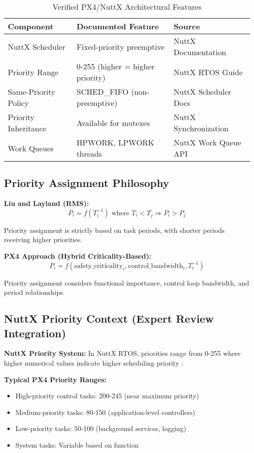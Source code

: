 \documentclass[12pt,a4paper]{article}
\begin{document}
\begin{table}[H]
\centering
\begin{tabular}{|l|l|l|}
\hline
\textbf{Component} & \textbf{Documented Feature} & \textbf{Source} \\
\hline
NuttX Scheduler & Fixed-priority preemptive & NuttX Documentation \\
Priority Range & 0-255 (higher = higher priority) & NuttX RTOS Guide \\
Same-Priority Policy & SCHED\_FIFO (non-preemptive) & NuttX Scheduler Docs \\
Priority Inheritance & Available for mutexes & NuttX Synchronization \\
Work Queues & HPWORK, LPWORK threads & NuttX Work Queue API \\
\hline
\end{tabular}
\caption{Verified PX4/NuttX Architectural Features}
\end{table}

\subsection{Priority Assignment Philosophy}

\textbf{Liu and Layland (RMS):}
\begin{equation}
P_i = f(T_i^{-1}) \text{ where } T_i < T_j \Rightarrow P_i > P_j
\end{equation}

Priority assignment is strictly based on task periods, with shorter periods receiving higher priorities.

\textbf{PX4 Approach (Hybrid Criticality-Based):}
\begin{equation}
P_i = f(\text{safety\_criticality}_i, \text{control\_bandwidth}_i, T_i^{-1})
\end{equation}

Priority assignment considers functional importance, control loop bandwidth, and period relationships.

\subsection{NuttX Priority Context (Expert Review Integration)}

\textbf{NuttX Priority System:} In NuttX RTOS, priorities range from 0-255 where higher numerical values indicate higher scheduling priority \cite{nuttx}.

\textbf{Typical PX4 Priority Ranges:}
\begin{itemize}
\item High-priority control tasks: 200-245 (near maximum priority)
\item Medium-priority tasks: 80-150 (application-level controllers)
\item Low-priority tasks: 50-100 (background services, logging)
\item System tasks: Variable based on function
\end{itemize}
\end{document}
